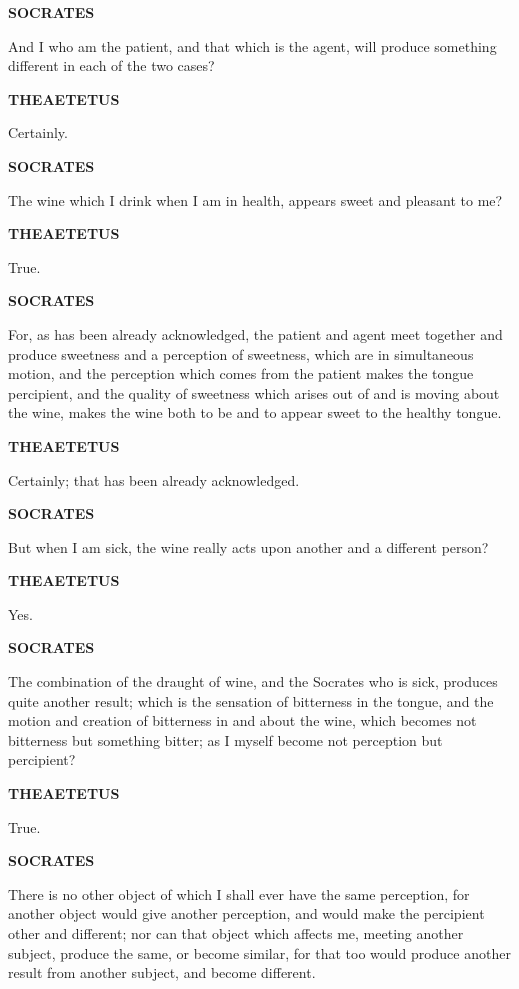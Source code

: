 \documentclass[11pt,letter]{article}
\begin{document}
\par \textbf{SOCRATES}
\par   And I who am the patient, and that which is the agent, will produce something different in each of the two cases?

\par \textbf{THEAETETUS}
\par   Certainly.

\par \textbf{SOCRATES}
\par   The wine which I drink when I am in health, appears sweet and pleasant to me?

\par \textbf{THEAETETUS}
\par   True.

\par \textbf{SOCRATES}
\par   For, as has been already acknowledged, the patient and agent meet together and produce sweetness and a perception of sweetness, which are in simultaneous motion, and the perception which comes from the patient makes the tongue percipient, and the quality of sweetness which arises out of and is moving about the wine, makes the wine both to be and to appear sweet to the healthy tongue.

\par \textbf{THEAETETUS}
\par   Certainly; that has been already acknowledged.

\par \textbf{SOCRATES}
\par   But when I am sick, the wine really acts upon another and a different person?

\par \textbf{THEAETETUS}
\par   Yes.

\par \textbf{SOCRATES}
\par   The combination of the draught of wine, and the Socrates who is sick, produces quite another result; which is the sensation of bitterness in the tongue, and the motion and creation of bitterness in and about the wine, which becomes not bitterness but something bitter; as I myself become not perception but percipient?

\par \textbf{THEAETETUS}
\par   True.

\par \textbf{SOCRATES}
\par   There is no other object of which I shall ever have the same perception, for another object would give another perception, and would make the percipient other and different; nor can that object which affects me, meeting another subject, produce the same, or become similar, for that too would produce another result from another subject, and become different.
\end{document}
